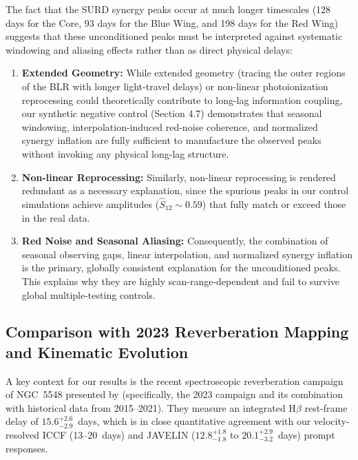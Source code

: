 \documentclass[fleqn,usenatbib]{mnras}
\begin{document}
The fact that the SURD synergy peaks occur at much longer timescales (128 days for the Core, 93 days for the Blue Wing, and 198 days for the Red Wing) suggests that these unconditioned peaks must be interpreted against systematic windowing and aliasing effects rather than as direct physical delays:
\begin{enumerate}
\item \textbf{Extended Geometry:} While extended geometry (tracing the outer regions of the BLR with longer light-travel delays) or non-linear photoionization reprocessing could theoretically contribute to long-lag information coupling, our synthetic negative control (Section 4.7) demonstrates that seasonal windowing, interpolation-induced red-noise coherence, and normalized synergy inflation are fully sufficient to manufacture the observed peaks without invoking any physical long-lag structure.
\item \textbf{Non-linear Reprocessing:} Similarly, non-linear reprocessing is rendered redundant as a necessary explanation, since the spurious peaks in our control simulations achieve amplitudes ($\widehat{S}_{12} \sim 0.59$) that fully match or exceed those in the real data.
\item \textbf{Red Noise and Seasonal Aliasing:} Consequently, the combination of seasonal observing gaps, linear interpolation, and normalized synergy inflation is the primary, globally consistent explanation for the unconditioned peaks. This explains why they are highly scan-range-dependent and fail to survive global multiple-testing controls.
\end{enumerate}

\subsection{Comparison with 2023 Reverberation Mapping and Kinematic Evolution}
\label{sec:comparison_xi}

A key context for our results is the recent spectroscopic reverberation campaign of NGC~5548 presented by \citet{Xi2025} (specifically, the 2023 campaign and its combination with historical data from 2015--2021). They measure an integrated H\(\beta\) rest-frame delay of \(15.6_{-2.9}^{+2.6}\)~days, which is in close quantitative agreement with our velocity-resolved ICCF (13--20~days) and JAVELIN (\(12.8_{-1.8}^{+1.8}\) to \(20.1_{-3.2}^{+2.9}\)~days) prompt responses. 
\end{document}
